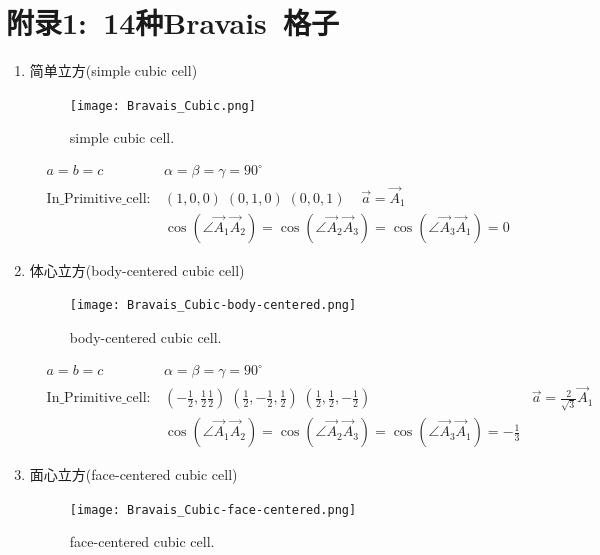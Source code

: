 \documentclass{article}      %
\begin{document}
\section{附录1:~14种\rm{Bravais~}格子}
\begin{enumerate}
		\item 简单立方(\textrm{simple cubic cell})
\begin{figure}[h!]
\centering
\texttt{[image: Bravais\_Cubic.png]}
\caption{\small simple cubic cell.}%
\label{Bravais:Cubic}
\end{figure}
\begin{displaymath}
	\begin{aligned}
	& a=b=c &\alpha=\beta=\gamma=90^{\circ} \\
		&\mathrm{In\_Primitive\_cell}:&(1,0,0)\;(0,1,0)\;(0,0,1)\;\;\;\;\vec a=\vec A_1 \\
		& &\cos(\angle\vec A_1\vec A_2)=\cos(\angle\vec A_2\vec A_3)=\cos(\angle\vec A_3\vec A_1)=0
	\end{aligned}
\end{displaymath}
		\item 体心立方(\textrm{body-centered cubic cell})
\begin{figure}[h!]
\centering
\texttt{[image: Bravais\_Cubic-body-centered.png]}
\caption{\small body-centered cubic cell.}%
\label{Bravais:body-centered Cubic}
\end{figure}
\begin{displaymath}
	\begin{aligned}
		& a=b=c &\alpha=\beta=\gamma=90^{\circ} \\
		&\mathrm{In\_Primitive\_cell}: &(-\frac12,\frac12\frac12)\;(\frac12,-\frac12,\frac12)\;(\frac12,\frac12,-\frac12)\;\;\;\;&\vec a=\frac2{\sqrt 3}\vec A_1\\
		& &\cos(\angle\vec A_1\vec A_2)=\cos(\angle\vec A_2\vec A_3)=\cos(\angle\vec A_3\vec A_1)=-\frac13
	\end{aligned}
\end{displaymath}
		\item 面心立方(\textrm{face-centered cubic cell})
\begin{figure}[h!]
\centering
\texttt{[image: Bravais\_Cubic-face-centered.png]}
\caption{\small face-centered cubic cell.}%
\label{Bravais:face-centered Cubic}
\end{figure}
\begin{displaymath}
	\begin{aligned}

\end{aligned}
\end{displaymath}
\end{enumerate}
\end{document}
